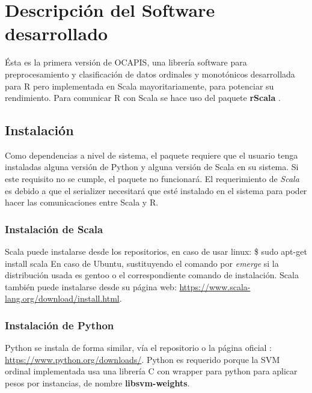 
\chapter{Descripción del Software desarrollado}

Ésta es la primera versión de OCAPIS, una librería software para preprocesamiento y clasificación de datos ordinales y monotónicos desarrollada para R pero implementada en Scala mayoritariamente, para potenciar su rendimiento. Para comunicar R con Scala se hace uso del paquete \textbf{rScala} \cite{dahlintegration}.

\section{Instalación}
Como dependencias a nivel de sistema, el paquete requiere que el usuario tenga instaladas alguna versión de Python y alguna versión de Scala en su sistema. Si este requisito no se cumple, el paquete no funcionará. El requerimiento de \textit{Scala} es debido a que el serializer necesitará que esté instalado en el sistema para poder hacer las comunicaciones entre Scala y R. 
\subsection{Instalación de Scala}
Scala puede instalarse desde los repositorios, en caso de usar linux:
\vspace{3pt}
\hline
\vspace{7pt}
 \$ sudo apt-get install scala
 \vspace{7pt}
 \hline
 \vspace{3pt}
En caso de Ubuntu, sustituyendo el comando por \textit{emerge} si la distribución usada es gentoo o el correspondiente comando de instalación. Scala también puede instalarse desde su página web: \url{https://www.scala-lang.org/download/install.html}. \newline

\subsection{Instalación de Python}
Python se instala de forma similar, vía el repositorio o la página oficial : \url{https://www.python.org/downloads/}. Python es requerido porque la SVM ordinal implementada usa una librería C con wrapper para python para aplicar pesos por instancias, de nombre \textbf{libsvm-weights}.

